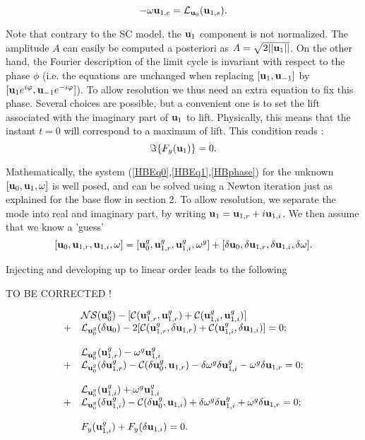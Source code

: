 \documentclass[twocolumn,10pt]{asme2ej}
\newcommand{\be}[1]{ \begin{equation} \label{#1}}
\newcommand{\ee}{\end{equation}}
\begin{document}
\be{HBEq1b}
 -\omega {\bf u }_{1,c} =  {\cal L}_{{\bf u }_0}(  {\bf u }_{1,s} ).
\ee


Note that contrary to the SC model, the ${\bf u }_1$ component is not normalized. The amplitude $A$ can easily be computed a posteriori as $A = \sqrt{2 ||{\bf u }_1||}$. On the other hand, the Fourier description of the limit cycle is invariant with respect to the phase $\phi$ (i.e. the equations are unchanged when replacing $[ {\bf u }_1,  {\bf u }_{-1}] $ by  $[ {\bf u }_1 e^{i\varphi},  {\bf u }_{-1}  e^{-i\varphi}] $). 
To allow resolution we thus need an extra equation to fix this phase. Several choices are possible, but a convenient one is to set the lift associated with the imaginary part of ${\bf u }_1$ to lift. Physically, this means that the instant $t=0$ will correspond to a maximum of lift. This condition reads :
\be{HBphase}
\Im \{F_y({\bf u}_1) \} =0.
\ee

Mathematically, the system (\ref{HBEq0},\ref{HBEq1},\ref{HBphase}) for the unknown $[{\bf u }_0, {\bf u }_{1}, \omega]$ is well posed, and can be solved using a Newton iteration just as explained for the base flow in section 2. To allow resolution, we separate the mode into real and imaginary part, by writing ${\bf u }_1 = {\bf u }_{1,r} +  i {\bf u }_{1,i} $.
We then assume that we know a 'guess' 
$$
[{\bf u }_0, {\bf u }_{1,r}, {\bf u }_{1,i}, \omega] = 
 [{\bf u }_0^g, {\bf u }_{1,r}^g, {\bf u }_{1,i}^g, \omega^g]
+ [\delta {\bf u }_0, \delta {\bf u }_{1,r}, \delta {\bf u }_{1,i}, \delta \omega].
$$

Injecting and developing up to linear order leads to the following 

TO BE CORRECTED !

\begin{equation}
\begin{array}{ll}
\displaystyle
& {\cal NS}(  {\bf u }_0^g ) - [ {\cal C}( {\bf u }_{1,r}^g,{\bf u }_{1,r}^g) +  {\cal C}( {\bf u }_{1,i}^g,{\bf u }_{1,i}^g) ]
\\
+& {\cal L}_{{\bf u }_0^g}(\delta {\bf u }_0) - 2 [ {\cal C}( {\bf u }_{1,r}^g,\delta {\bf u }_{1,r}) +  {\cal C}( {\bf u }_{1,i}^g,\delta {\bf u }_{1,i}) ] = 0;
\\
\\
&  {\cal L}_{{\bf u }_0^g}( {\bf u }_{1,r}^g) - \omega^g {\bf u }_{1,i}^g 
 \\
  +& {\cal L}_{{\bf u }_0^g}( \delta {\bf u }_{1,r}^g) 
   -  {\cal C}( \delta {\bf u }_{0}^g, {\bf u }_{1,r})
   - \delta \omega^g \delta {\bf u }_{1,i}^g 
 - \omega^g \delta {\bf u }_{1,r} = 0 ;
 \\
\\
&  {\cal L}_{{\bf u }_0^g}({\bf u }_{1,i}^g) + \omega^g {\bf u }_{1,i}^g
 \\
  +& {\cal L}_{{\bf u }_0^g}( \delta {\bf u }_{1,i}^g) 
  -  {\cal C}( \delta {\bf u }_{0}^g, {\bf u }_{1,i}) 
  + \delta \omega^g \delta {\bf u }_{1,i}^g 
+ \omega^g \delta {\bf u }_{1,r} = 0 ;
\\
\\
& F_y({\bf u }_{1,i}^g) + F_y(\delta {\bf u }_{1,i}) = 0.
 \end{array}
\end{equation}
\end{document}
